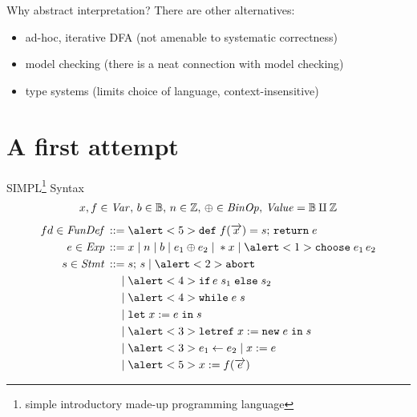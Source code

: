 \documentclass[aspectratio=169]{beamer}
\begin{document}


\begin{frame}{Why abstract interpretation?}
There are other alternatives:
\begin{itemize}[<+->]
\item ad-hoc, iterative DFA (not amenable to systematic correctness)
\item model checking (there is a neat connection with model checking)
\item type systems (limits choice of language, context-insensitive)
\end{itemize}
\end{frame}

\section{A first attempt}
\begin{frame}{SIMPL\footnote{simple introductory made-up programming language} Syntax}
  \vspace{-2em}
  \small
  \begin{gather*}
    x,f \in \mathit{Var},\, b \in \mathbb{B},\, n \in \mathbb{Z},\, \oplus \in \mathit{BinOp},\,\mathit{Value} = \mathbb{B} \amalg \mathbb{Z}
  \end{gather*}\vspace{-2em}
  \begin{align*}
    fd \in \ns{FunDef} \eDEF & \alert<5>{\kw{def}\; f(\vo{x}) = s;\,\kw{return}\; e} \\
    e \in \Exp \eDEF & x \eOR n \eOR b \eOR e_1 \oplus e_2 \eOR *x \eOR \alert<1>{\kw{choose}\;e_1\,e_2} \\
    s \in \Stmt \eDEF & s;\,s \eOR \alert<2>{\kw{abort}} \\
    \eOR & \alert<4>{\kw{if}\, e\; s_1 \; \kw{else} \; s_2} \\
    \eOR & \alert<4>{\kw{while}\; e\; s} \\
    \eOR & \kw{let}\; x := e \;\kw{in}\;s \\
    \eOR & \alert<3>{\kw{letref}\; x := \kw{new}\;e \;\kw{in}\;s} \\
    \eOR & \alert<3>{e_1 \update e_2} \eOR x := e \\
    \eOR & \alert<5>{x := f(\vo{e})}
  \end{align*}
\end{frame}
\end{document}
